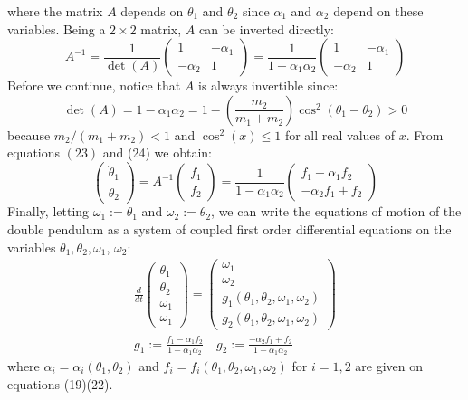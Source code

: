 \documentclass[12pt]{article}
\begin{document}
	where the matrix $A$ depends on $\theta_{1}$ and $\theta_{2}$ since $\alpha_{1}$ and $\alpha_{2}$ depend on these variables. Being a $2 \times 2$ matrix, $A$ can be inverted directly:
	$$
	A^{-1}=\frac{1}{\operatorname{det}(A)}\left(\begin{array}{cc}
	1 & -\alpha_{1} \\
	-\alpha_{2} & 1
	\end{array}\right)=\frac{1}{1-\alpha_{1} \alpha_{2}}\left(\begin{array}{cc}
	1 & -\alpha_{1} \\
	-\alpha_{2} & 1
	\end{array}\right)
	$$
	Before we continue, notice that $A$ is always invertible since:
	$$
	\operatorname{det}(A)=1-\alpha_{1} \alpha_{2}=1-\left(\frac{m_{2}}{m_{1}+m_{2}}\right) \cos ^{2}\left(\theta_{1}-\theta_{2}\right)>0
	$$
	because $m_{2} /\left(m_{1}+m_{2}\right)<1$ and $\cos ^{2}(x) \leq 1$ for all real values of $x$. From equations $(23)$ and (24) we obtain:
	$$
	\left(\begin{array}{l}
	\ddot{\theta}_{1} \\
	\ddot{\theta}_{2}
	\end{array}\right)=A^{-1}\left(\begin{array}{l}
	f_{1} \\
	f_{2}
	\end{array}\right)=\frac{1}{1-\alpha_{1} \alpha_{2}}\left(\begin{array}{c}
	f_{1}-\alpha_{1} f_{2} \\
	-\alpha_{2} f_{1}+f_{2}
	\end{array}\right)
	$$
	Finally, letting $\omega_{1}:=\dot{\theta}_{1}$ and $\omega_{2}:=\dot{\theta}_{2}$, we can write the equations of motion of the double pendulum as a system of coupled first order differential equations on the variables $\theta_{1}, \theta_{2}, \omega_{1}$, $\omega_{2}:$
	$$
	\begin{array}{c}
	\frac{d}{d t}\left(\begin{array}{c}
	\theta_{1} \\
	\theta_{2} \\
	\omega_{1} \\
	\omega_{1}
	\end{array}\right)=\left(\begin{array}{c}
	\omega_{1} \\
	\omega_{2} \\
	g_{1}\left(\theta_{1}, \theta_{2}, \omega_{1}, \omega_{2}\right) \\
	g_{2}\left(\theta_{1}, \theta_{2}, \omega_{1}, \omega_{2}\right)
	\end{array}\right) \\
	g_{1}:=\frac{f_{1}-\alpha_{1} f_{2}}{1-\alpha_{1} \alpha_{2}} \quad g_{2}:=\frac{-\alpha_{2} f_{1}+f_{2}}{1-\alpha_{1} \alpha_{2}}
	\end{array}
	$$
	where $\alpha_{i}=\alpha_{i}\left(\theta_{1}, \theta_{2}\right)$ and $f_{i}=f_{i}\left(\theta_{1}, \theta_{2}, \omega_{1}, \omega_{2}\right)$ for $i=1,2$ are given on equations (19)(22).
	
\end{document}
